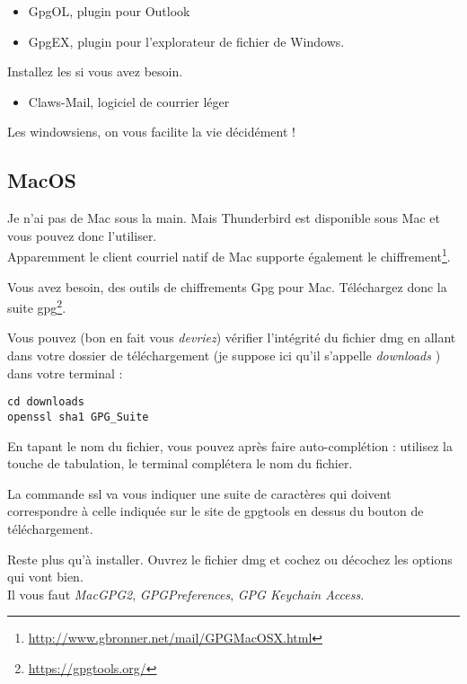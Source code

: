 \begin{itemize}
\itemsep1pt\parskip0pt
\item
  GpgOL, plugin pour Outlook
\item
  GpgEX, plugin pour l'explorateur de fichier de Windows.
\end{itemize}

Installez les si vous avez besoin.

\begin{itemize}
\itemsep1pt\parskip0pt
\item
  Claws-Mail, logiciel de courrier léger
\end{itemize}

Les windowsiens, on vous facilite la vie décidément !

\subsection{MacOS}\label{macos}

Je n'ai pas de Mac sous la main. Mais Thunderbird est disponible sous
Mac et vous pouvez donc l'utiliser.\\Apparemment
le client courriel natif de Mac supporte également le chiffrement\footnote{\url{http://www.gbronner.net/mail/GPGMacOSX.html}}.

Vous avez besoin, des outils de chiffrements Gpg pour Mac. Téléchargez donc la suite
gpg\footnote{\url{https://gpgtools.org/}}.

Vous pouvez (bon en fait vous \emph{devriez}) vérifier l'intégrité du
fichier dmg en allant dans votre dossier de téléchargement (je suppose
ici qu'il s'appelle \emph{downloads} ) dans votre terminal :

\begin{lstlisting}
cd downloads
openssl sha1 GPG_Suite
\end{lstlisting}

En tapant le nom du fichier, vous pouvez après faire auto-complétion :
utilisez la touche de tabulation, le terminal complétera le nom du
fichier.

La commande ssl va vous indiquer une suite de caractères qui doivent
correspondre à celle indiquée sur le site de gpgtools en dessus du
bouton de téléchargement.

Reste plus qu'à installer. Ouvrez le fichier dmg et cochez ou décochez
les options qui vont bien.\\Il vous faut \emph{MacGPG2},
\emph{GPGPreferences}, \emph{GPG Keychain Access}.

